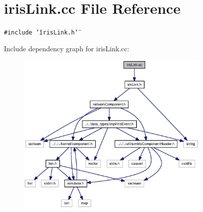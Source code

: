 \section{irisLink.cc File Reference}
\label{irisLink_8cc}
{\tt \#include \char`\"{}irisLink.h\char`\"{}}\par


Include dependency graph for irisLink.cc:\nopagebreak
\begin{figure}[H]
\begin{center}
\leavevmode
\includegraphics[width=266pt]{irisLink_8cc__incl}
\end{center}
\end{figure}
